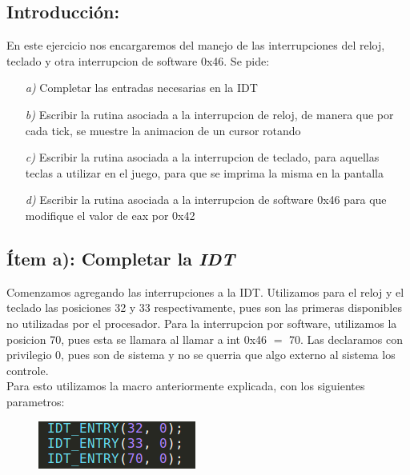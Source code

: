 \subsection{Introducción:}

En este ejercicio nos encargaremos del manejo de las interrupciones del reloj, teclado y otra interrupcion de software 0x46. Se pide:

\begin{itemize}
\item [\textit{a)}] Completar las entradas necesarias en la IDT
\item [\textit{b)}] Escribir la rutina asociada a la interrupcion de reloj, de manera que por cada tick, se muestre la animacion de un cursor rotando
\item [\textit{c)}]  Escribir la rutina asociada a la interrupcion de teclado, para aquellas teclas a utilizar en el juego, para que se imprima la misma en la pantalla
\item [\textit{d)}] Escribir la rutina asociada a la interrupcion de software 0x46 para que modifique el valor de eax por 0x42
\end{itemize}



\subsection{Ítem a): Completar la \textit{IDT}}

Comenzamos agregando las interrupciones a la IDT. Utilizamos para el reloj y el teclado las posiciones 32 y 33 respectivamente, pues son las primeras disponibles no utilizadas por el procesador. Para la interrupcion por software, utilizamos la posicion 70, pues esta se llamara al llamar a int 0x46 $=$ 70. Las declaramos con privilegio 0, pues son de sistema y no se querria que algo externo al sistema los controle. \\
Para esto utilizamos la macro anteriormente explicada, con los siguientes parametros:

\begin{figure}[H]
\begin{center}
  \includegraphics[width=\linewidth]{ejercicio5/idt.png}
\endminipage
\end{center}
\end{figure}


